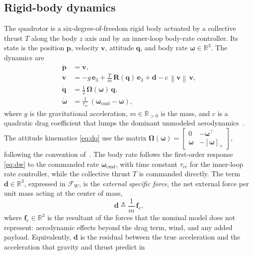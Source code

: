 \documentclass[lettersize,journal]{IEEEtran}
\newcommand{\R}{\mathbb{R}}
\newcommand{\norm}[1]{\left\| #1 \right\|}
\newcommand{\vect}[1]{\bm{#1}}
\newcommand{\mat}[1]{\mathbf{#1}}
\begin{document}
\subsection{Rigid-body dynamics}
The quadrotor is a six-degree-of-freedom rigid body actuated by a collective
thrust $T$ along the body $z$ axis and by an inner-loop body-rate controller. Its
state is the position $\vect{p}$, velocity $\vect{v}$, attitude $\vect{q}$, and
body rate $\vect{\omega}\in\R^3$. The dynamics are
\begin{align}
\dot{\vect{p}} &= \vect{v}, \label{eq:dp}\\
\dot{\vect{v}} &= -g\,\vect{e}_3 + \frac{T}{m}\,\mat{R}(\vect{q})\,\vect{e}_3
                  + \vect{d} - c\,\norm{\vect{v}}\,\vect{v},
                  \label{eq:dv}\\
\dot{\vect{q}} &= \tfrac{1}{2}\,\mat{\Omega}(\vect{\omega})\,\vect{q},
                  \label{eq:dq}\\
\dot{\vect{\omega}} &= \tfrac{1}{\tau_{rc}}\,(\vect{\omega}_{\text{cmd}}-\vect{\omega}),
                  \label{eq:dw}
\end{align}
where $g$ is the gravitational acceleration, $m\in\R_{>0}$ is the mass, and $c$
is a quadratic drag coefficient that lumps the dominant unmodeled
aerodynamics~\cite{sun2022comparative}. The attitude kinematics \eqref{eq:dq} use
the matrix
$\mat{\Omega}(\vect{\omega})=\left[\begin{smallmatrix}0 & -\vect{\omega}^{\!\top}\\[2pt] \vect{\omega} & -[\vect{\omega}]_\times\end{smallmatrix}\right]$,
following the convention of~\cite{shuster1993survey,barfoot2017state}. The body rate follows the
first-order response \eqref{eq:dw} to the commanded rate
$\vect{\omega}_{\text{cmd}}$, with time constant $\tau_{rc}$ for the inner-loop
rate controller, while the collective thrust $T$ is commanded directly. The term
$\vect{d}\in\R^3$, expressed in $\mathcal{F}_W$, is the \textit{external
specific force}, the net external force per unit mass acting at the center of
mass,
\begin{equation}
\vect{d}\triangleq \frac{1}{m}\,\vect{f}_e ,
\label{eq:dfdef}
\end{equation}
where $\vect{f}_e\in\R^3$ is the resultant of the forces that the nominal model
does not represent: aerodynamic effects beyond the drag term, wind, and any
added payload. Equivalently, $\vect{d}$ is the residual between the true
acceleration and the acceleration that gravity and thrust predict in
\end{document}
